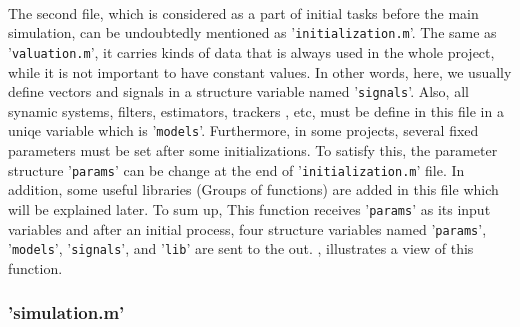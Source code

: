 {{{			\paragraph{} {
				The second file, which is considered as a part of initial tasks before the main simulation, can be undoubtedly mentioned as '\texttt{initialization.m}'.
				The same as '\texttt{valuation.m}', it carries kinds of data that is always used in the whole project, while it is not important to have constant values.
				In other words, here, we usually define vectors and signals in a structure variable named '\texttt{signals}'.
				Also, all synamic systems, filters, estimators, trackers , etc, must be define in this file in a uniqe variable which is '\texttt{models}'.
				Furthermore, in some projects, several fixed parameters must be set after some initializations.
				To satisfy this, the parameter structure '\texttt{params}' can be change at the end of '\texttt{initialization.m}' file.
				In addition, some useful libraries (Groups of functions) are added in this file which will be explained later.
				To sum up, This function receives '\texttt{params}' as its input variables and after an initial process, four structure variables named '\texttt{params}', '\texttt{models}', '\texttt{signals}', and '\texttt{lib}' are sent to the out. , illustrates a view of this function.
			}
			\begin{figure}[tbp]
			\end{figure}
		}

		\subsubsection{'simulation.m'} {
}}}
